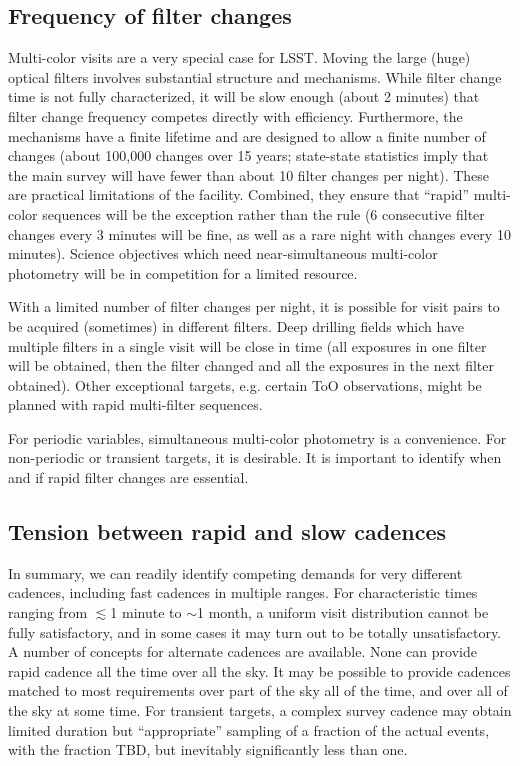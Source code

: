 \subsection{Frequency of filter changes}

Multi-color visits are a very special case for LSST.  Moving the large
(huge) optical filters involves substantial structure and mechanisms.
While filter change time is not fully characterized, it will be slow
enough (about 2 minutes) that filter change frequency competes directly with efficiency.
Furthermore, the mechanisms have a finite lifetime and are designed
to allow a finite number of changes (about 100,000 changes over 15 years;
state-state statistics imply that the main survey will have fewer than
about 10 filter changes per night). These are practical
limitations of the facility. Combined, they ensure that ``rapid''
multi-color sequences will be the exception rather than the rule
(6 consecutive filter changes every 3 minutes will be fine, as well as
a rare night with changes every 10 minutes).
Science objectives which need near-simultaneous multi-color photometry
will be in competition for a limited resource.

With a limited number of filter changes per night, it is possible for
visit pairs to be acquired (sometimes) in different filters.  Deep
drilling fields which have multiple filters in a single visit will be
close in time (all exposures in one filter will be obtained, then the
filter changed and all the exposures in the next filter obtained).
Other exceptional targets, e.g. certain ToO observations, might be
planned with rapid multi-filter sequences.

For periodic variables, simultaneous multi-color photometry is a
convenience.  For non-periodic or transient targets, it is desirable. It
is important to identify when and if rapid filter changes are essential.

\subsection{Tension between rapid and slow cadences}

In summary, we can readily identify competing demands for very different
cadences, including fast cadences in multiple ranges. For characteristic
times ranging from  $\lesssim$1 minute to $\sim$1 month, a uniform
visit distribution cannot be fully satisfactory, and in some cases it
may turn out to be totally unsatisfactory.  A number of concepts for
alternate cadences are available.  None can provide rapid cadence all
the time over all the sky. It may be possible to provide cadences
matched to most requirements over part of the sky all of the time, and
over all of the sky at some time. For transient targets, a complex
survey cadence may obtain limited duration but ``appropriate'' sampling
of a fraction of the actual events, with the fraction TBD, but
inevitably significantly less than one.

